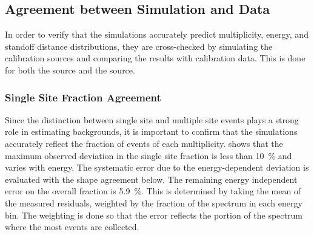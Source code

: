 \documentclass[herrin-thesis.tex]{subfiles}
\begin{document}
\subsection{Agreement between Simulation and Data}
In order to verify that the simulations accurately predict multiplicity, energy, and standoff distance distributions, they are cross-checked by simulating the calibration sources and comparing the results with calibration data. This is done for both the  source and the  source.

\subsubsection{Single Site Fraction Agreement}
\label{sec:analysis_ss_frac_agreement}
Since the distinction between single site and multiple site events plays a strong role in estimating backgrounds, it is important to confirm that the simulations accurately reflect the fraction of events of each multiplicity.  shows that the maximum observed deviation in the single site fraction is less than \SI{10}{\percent} and varies with energy. The systematic error due to the energy-dependent deviation is evaluated with the shape agreement below. The remaining energy independent error on the overall fraction is \SI{5.9}{\percent}. This is determined by taking the mean of the measured residuals, weighted by the fraction of the \twonu{} spectrum in each energy bin. The weighting is done so that the error reflects the portion of the spectrum where the most events are collected.
\end{document}
